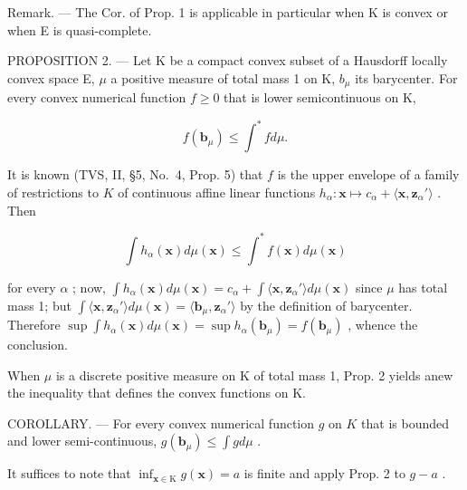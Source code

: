 Remark. --- The Cor. of Prop. 1 is applicable in particular when K is convex or when E is quasi-complete.

PROPOSITION 2. --- Let K be a compact convex subset of a Hausdorff locally convex space E, \(\mu\) a positive measure of total mass 1 on K, \(b_{\mu}\) its barycenter. For every convex numerical function \(f \geqslant 0\) that is lower semicontinuous on K,

\[
f (\mathbf {b} _ {\mu}) \leqslant \int^ {*} f d \mu .
\]

It is known (TVS, II, §5, No.~4, Prop. 5) that \(f\) is the upper envelope of a family of restrictions to \(K\) of continuous affine linear functions \(h_{\alpha} : \mathbf{x} \mapsto c_{\alpha} + \langle \mathbf{x}, \mathbf{z}_{\alpha}' \rangle\) . Then

\[
\int h _ {\alpha} (\mathbf {x}) d \mu (\mathbf {x}) \leqslant \int^ {*} f (\mathbf {x}) d \mu (\mathbf {x})
\]

for every \(\alpha\) ; now, \(\int h_{\alpha}(\mathbf{x}) d\mu (\mathbf{x}) = c_{\alpha} + \int \langle \mathbf{x}, \mathbf{z}_{\alpha}' \rangle d\mu (\mathbf{x})\) since \(\mu\) has total mass 1; but \(\int \langle \mathbf{x}, \mathbf{z}_{\alpha}' \rangle d\mu (\mathbf{x}) = \langle \mathbf{b}_{\mu}, \mathbf{z}_{\alpha}' \rangle\) by the definition of barycenter. Therefore \(\sup \int h_{\alpha}(\mathbf{x}) d\mu (\mathbf{x}) = \sup h_{\alpha}(\mathbf{b}_{\mu}) = f(\mathbf{b}_{\mu})\) , whence the conclusion.

When \(\mu\) is a discrete positive measure on K of total mass 1, Prop. 2 yields anew the inequality that defines the convex functions on K.

COROLLARY. --- For every convex numerical function \(g\) on \(K\) that is bounded and lower semi-continuous, \(g(\mathbf{b}_{\mu}) \leqslant \int g d\mu\) .

It suffices to note that \(\inf_{\mathbf{x} \in \mathrm{K}} g(\mathbf{x}) = a\) is finite and apply Prop. 2 to \(g - a\) .
\relax{}
